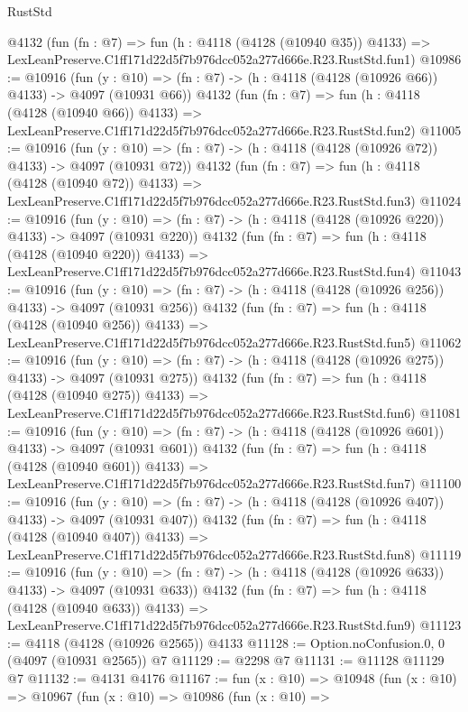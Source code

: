 \begin{lexlean}{RustStd}
\begin{coremodule}
    @4132
    (fun (fn : @7) =>
    fun (h : @4118 (@4128 (@10940 @35)) @4133) =>
    LexLeanPreserve.C1ff171d22d5f7b976dcc052a277d666e.R23.RustStd.fun1)
@10986 := @10916
    (fun (y : @10) => (fn : @7) -> (h : @4118 (@4128 (@10926 @66)) @4133) -> @4097 (@10931 @66))
    @4132
    (fun (fn : @7) =>
    fun (h : @4118 (@4128 (@10940 @66)) @4133) =>
    LexLeanPreserve.C1ff171d22d5f7b976dcc052a277d666e.R23.RustStd.fun2)
@11005 := @10916
    (fun (y : @10) => (fn : @7) -> (h : @4118 (@4128 (@10926 @72)) @4133) -> @4097 (@10931 @72))
    @4132
    (fun (fn : @7) =>
    fun (h : @4118 (@4128 (@10940 @72)) @4133) =>
    LexLeanPreserve.C1ff171d22d5f7b976dcc052a277d666e.R23.RustStd.fun3)
@11024 := @10916
    (fun (y : @10) => (fn : @7) -> (h : @4118 (@4128 (@10926 @220)) @4133) -> @4097 (@10931 @220))
    @4132
    (fun (fn : @7) =>
    fun (h : @4118 (@4128 (@10940 @220)) @4133) =>
    LexLeanPreserve.C1ff171d22d5f7b976dcc052a277d666e.R23.RustStd.fun4)
@11043 := @10916
    (fun (y : @10) => (fn : @7) -> (h : @4118 (@4128 (@10926 @256)) @4133) -> @4097 (@10931 @256))
    @4132
    (fun (fn : @7) =>
    fun (h : @4118 (@4128 (@10940 @256)) @4133) =>
    LexLeanPreserve.C1ff171d22d5f7b976dcc052a277d666e.R23.RustStd.fun5)
@11062 := @10916
    (fun (y : @10) => (fn : @7) -> (h : @4118 (@4128 (@10926 @275)) @4133) -> @4097 (@10931 @275))
    @4132
    (fun (fn : @7) =>
    fun (h : @4118 (@4128 (@10940 @275)) @4133) =>
    LexLeanPreserve.C1ff171d22d5f7b976dcc052a277d666e.R23.RustStd.fun6)
@11081 := @10916
    (fun (y : @10) => (fn : @7) -> (h : @4118 (@4128 (@10926 @601)) @4133) -> @4097 (@10931 @601))
    @4132
    (fun (fn : @7) =>
    fun (h : @4118 (@4128 (@10940 @601)) @4133) =>
    LexLeanPreserve.C1ff171d22d5f7b976dcc052a277d666e.R23.RustStd.fun7)
@11100 := @10916
    (fun (y : @10) => (fn : @7) -> (h : @4118 (@4128 (@10926 @407)) @4133) -> @4097 (@10931 @407))
    @4132
    (fun (fn : @7) =>
    fun (h : @4118 (@4128 (@10940 @407)) @4133) =>
    LexLeanPreserve.C1ff171d22d5f7b976dcc052a277d666e.R23.RustStd.fun8)
@11119 := @10916
    (fun (y : @10) => (fn : @7) -> (h : @4118 (@4128 (@10926 @633)) @4133) -> @4097 (@10931 @633))
    @4132
    (fun (fn : @7) =>
    fun (h : @4118 (@4128 (@10940 @633)) @4133) =>
    LexLeanPreserve.C1ff171d22d5f7b976dcc052a277d666e.R23.RustStd.fun9)
@11123 := @4118 (@4128 (@10926 @2565)) @4133
@11128 := Option.noConfusion.{0, 0} (@4097 (@10931 @2565)) @7
@11129 := @2298 @7
@11131 := @11128 @11129 @7
@11132 := @4131 @4176
@11167 := fun (x : @10) =>
  @10948
    (fun (x : @10) =>
    @10967
      (fun (x : @10) =>
      @10986
        (fun (x : @10) =>

\end{coremodule}
\end{lexlean}
